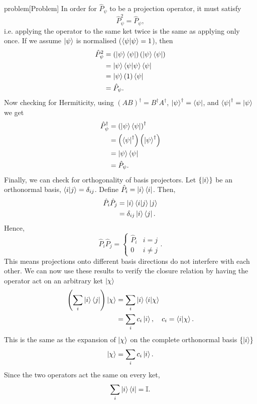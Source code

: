 \documentclass{article}
\begin{document}
\begin{callout}{problem}[Problem]
In order for $\hat{P}_\psi$ to be a projection operator, it must satisfy
\[
    \hat{P}_\psi ^2=\hat{P}_\psi ,
\]
i.e. applying the operator to the same ket twice is the same as applying only once. If we assume $\ket{\psi }$ is normalised ($\braket{\psi }{\psi }=1$), then
\begin{align*}
    \hat{P}_\psi^2 &= \left( \ket{\psi }\bra{\psi } \right) \left( \ket{\psi }\bra{\psi } \right) \\
                   &= \ket{\psi }\braket{\psi }{\psi }\bra{\psi } \\
                   &= \ket{\psi }(1)\bra{\psi }\\
                   &= \hat{P}_\psi .
\end{align*}
Now checking for Hermiticity, using $(AB)^\dagger=B^\dagger A^\dagger$, $\ket{\psi }^\dagger=\bra{\psi }$, and $\bra{\psi }^\dagger=\ket{\psi }$ we get
\begin{align*}
    \hat{P}_\psi^\dagger &= \left( \ket{\psi }\bra{\psi } \right)^\dagger \\
                         &= \left( \bra{\psi }^\dagger \right) \left( \ket{\psi }^\dagger \right) \\
                         &= \ket{\psi }\bra{\psi } \\
                         &= \hat{P}_\psi.
\end{align*}
Finally, we can check for orthogonality of basis projectors. Let $\left\{ \ket{i} \right\}$ be an orthonormal basis, $\braket{i}{j}=\delta _{ij}$. Define $\hat{P}_i=\ket{i}\bra{i}$. Then,
\begin{align*}
    \hat{P}_i \hat{P}_j&= \ket{i}\braket{i}{j}\ket{j} \\
                       &=\delta _{ij}\ket{i}\bra{j}.
\end{align*}
Hence,
\[
    \hat{P}_i\hat{P}_j=\begin{cases}
        \hat{P}_i & i=j \\
        0 & i\neq j
    \end{cases}.
\]
This means projections onto different basis directions do not interfere with each other. We can now use these results to verify the closure relation by having the operator act on an arbitrary ket $\ket{\chi }$
\begin{align*}
    \left( \sum_{i} \ket{i}\bra{j}\right)\ket{\chi } &= \sum_{i}\ket{i}\braket{i}{\chi } \\
                                                     &=\sum_{i}c_i \ket{i},\quad c_i=\braket{i}{\chi }.
\end{align*}
This is the same as the expansion of $\ket{\chi }$ on the complete orthonormal basis $\left\{ \ket{i} \right\}$
\[
    \ket{\chi }=\sum_{i}c_i \ket{i}.
\]
Since the two operators act the same on every ket,
\[
    \sum_{i}\ket{i}\bra{i}=\mathbb{I}.
\]
\end{callout}
\end{document}
